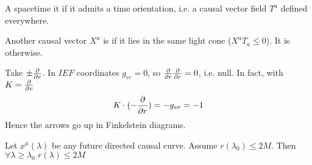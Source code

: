 \documentclass{article}
\begin{document}
\begin{definition}
A spacetime it  if it admits a time orientation, i.e. a causal vector field $T^a$ defined everywhere. 
\end{definition}


\begin{definition}
Another  causal vector $X^a$ is  if it lies in the same light cone ($X^a T_a \leq 0$). It is  otherwise.
\end{definition}

Take $\pm \frac{\partial}{\partial r}$. In $IEF$ coordinates $g_{rr}=0$, so $\frac{\partial}{\partial r} \frac{\partial}{\partial r} = 0$, i.e. null. In fact, with $K  = \frac{\partial}{\partial v}$
\[
K \cdot (-\frac{\partial}{\partial r}) = -g_{vr} = -1
\]
Hence the arrows go up in Finkelstein diagrams. 

\begin{prop}
Let $x^\mu(\lambda)$ be any future directed causal curve. Assume $r(\lambda_0)\leq 2M$. Then $\forall \lambda \geq \lambda_0 \; r(\lambda) \leq 2M$
\end{prop}
\end{document}
